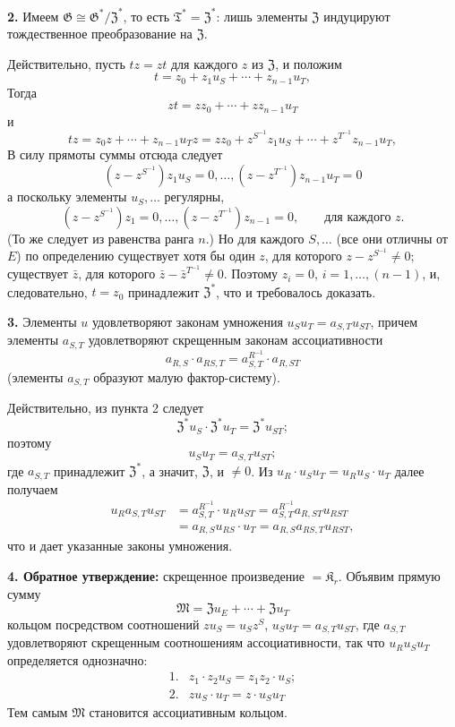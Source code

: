 \documentclass[11pt]{article}
\begin{document}
\noindent\textbf{2.} Имеем \(\mathfrak G\cong\mathfrak G^*/\mathfrak Z^*\), то есть \(\mathfrak T^*=\mathfrak Z^*\): лишь элементы \(\mathfrak Z\) индуцируют тождественное преобразование на \(\mathfrak Z\).

Действительно, пусть \(tz=zt\) для каждого \(z\) из \(\mathfrak Z\), и положим
\[
t=z_0+z_1u_S+\cdots+z_{n-1}u_T,
\]
Тогда
\[
zt=zz_0+\cdots+zz_{n-1}u_T
\]
и
\[
tz=z_0z+\cdots+z_{n-1}u_Tz
=zz_0+z^{S^{-1}}z_1u_S+\cdots+z^{T^{-1}}z_{n-1}u_T,
\]
В силу прямоты суммы отсюда следует
\[
(z-z^{S^{-1}})z_1u_S=0,\ldots,
(z-z^{T^{-1}})z_{n-1}u_T=0
\]
а поскольку элементы \(u_S,\ldots\) регулярны,
\[
(z-z^{S^{-1}})z_1=0,\ldots,
(z-z^{T^{-1}})z_{n-1}=0,
\qquad\text{для каждого }z.
\]
(То же следует из равенства ранга \(n\).) Но для каждого \(S,\ldots\) (все они отличны от \(E\)) по определению существует хотя бы один \(z\), для которого \(z-z^{S^{-1}}\neq0\); существует \(\bar z\), для которого \(\bar z-\bar z^{T^{-1}}\neq0\). Поэтому \(z_i=0\), \(i=1,\ldots,(n-1)\), и, следовательно, \(t=z_0\) принадлежит \(\mathfrak Z^*\), что и требовалось доказать.

\noindent\textbf{3.} Элементы \(u\) удовлетворяют законам умножения \(u_Su_T=a_{S,T}u_{ST}\), причем элементы \(a_{S,T}\) удовлетворяют скрещенным законам ассоциативности
\[
a_{R,S}\cdot a_{RS,T}=a_{S,T}^{R^{-1}}\cdot a_{R,ST}
\]
(элементы \(a_{S,T}\) образуют малую фактор-систему).

Действительно, из пункта 2 следует
\[
\mathfrak Z^*u_S\cdot\mathfrak Z^*u_T=\mathfrak Z^*u_{ST};
\]
поэтому
\[
u_Su_T=a_{S,T}u_{ST};
\]
где \(a_{S,T}\) принадлежит \(\mathfrak Z^*\), а значит, \(\mathfrak Z\), и \(\neq0\). Из \(u_R\cdot u_Su_T=u_Ru_S\cdot u_T\) далее получаем
\[
\begin{aligned}
u_Ra_{S,T}u_{ST}
&=a_{S,T}^{R^{-1}}\cdot u_Ru_{ST}
 =a_{S,T}^{R^{-1}}a_{R,ST}u_{RST}\\
&=a_{R,S}u_{RS}\cdot u_T
 =a_{R,S}a_{RS,T}u_{RST},
\end{aligned}
\]
что и дает указанные законы умножения.

\noindent\textbf{4. Обратное утверждение:} скрещенное произведение \(=\mathfrak K_r\). Объявим прямую сумму
\[
\mathfrak M=\mathfrak Zu_E+\cdots+\mathfrak Zu_T
\]
кольцом посредством соотношений \(zu_S=u_Sz^S\), \(u_Su_T=a_{S,T}u_{ST}\), где \(a_{S,T}\) удовлетворяют скрещенным соотношениям ассоциативности, так что \(u_Ru_Su_T\) определяется однозначно:
\[
\begin{array}{ll}
1.&z_1\cdot z_2u_S=z_1z_2\cdot u_S;\\[2pt]
2.&zu_S\cdot u_T=z\cdot u_Su_T
\end{array}
\]
Тем самым \(\mathfrak M\) становится ассоциативным кольцом.
\end{document}
